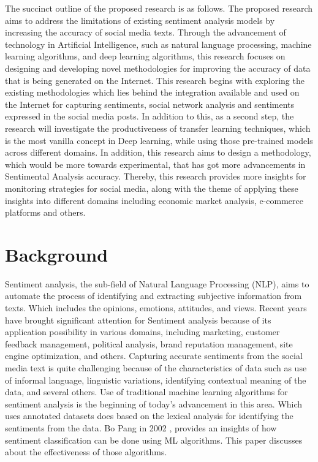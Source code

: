 \documentclass[a4paper,onecolumn,11pt]{article}
\begin{document}
The succinct outline of the proposed research is as follows. The proposed research aims to address the limitations of existing sentiment analysis models by increasing the accuracy of social media texts. Through the advancement of technology in Artificial Intelligence, such as natural language processing, machine  learning algorithms, and deep learning algorithms, this research focuses on designing  and developing novel methodologies for improving the accuracy of data that is being generated on the Internet. This research begins with exploring the existing methodologies which lies behind the integration available and used on the Internet for capturing sentiments, social network analysis and sentiments expressed in the social media posts. In addition to this, as a second step, the research will investigate the productiveness of transfer learning techniques, which is the most vanilla concept in Deep learning, while using those pre-trained models across different domains.  In addition, this research aims to design a methodology, which would be more towards experimental, that has got more advancements in Sentimental Analysis accuracy. Thereby, this research provides more insights for monitoring strategies for social media, along with the theme of applying these insights into different domains including economic market analysis, e-commerce platforms and others.




\section{Background}

Sentiment analysis, the sub-field of Natural Language Processing (NLP), aims to automate the process of identifying and extracting subjective information from texts. Which includes the opinions, emotions, attitudes, and views. Recent years have brought significant attention for Sentiment analysis because of its application possibility in various domains, including marketing, customer feedback management, political analysis, brand reputation management, site engine optimization, and others. Capturing accurate sentiments from the social media text is quite challenging because of the characteristics of data such as use of informal language, linguistic variations, identifying contextual meaning of the data, and several others.
 Use of traditional machine learning algorithms for sentiment analysis is the beginning of today’s advancement in this area. Which uses annotated datasets does based on the lexical analysis for identifying the sentiments from the data. Bo Pang in 2002 \cite{pang2002thumbs}, provides an insights of how sentiment classification can be done using ML algorithms. This paper discusses about the effectiveness of those algorithms. 
\end{document}
